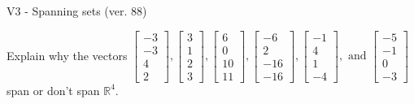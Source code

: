 \begin{exercise}
  \begin{exerciseTitle}V3 - Spanning sets (ver. 88)\end{exerciseTitle}
  \begin{exerciseStatement}
    Explain why the vectors \(\left[\begin{array}{r}
-3 \\
-3 \\
4 \\
2
\end{array}\right] , \left[\begin{array}{r}
3 \\
1 \\
2 \\
3
\end{array}\right] , \left[\begin{array}{r}
6 \\
0 \\
10 \\
11
\end{array}\right] , \left[\begin{array}{r}
-6 \\
2 \\
-16 \\
-16
\end{array}\right] , \left[\begin{array}{r}
-1 \\
4 \\
1 \\
-4
\end{array}\right] , \text{ and } \left[\begin{array}{r}
-5 \\
-1 \\
0 \\
-3
\end{array}\right]\) span or don't span \(\mathbb{R}^4\). 
	



\end{exerciseStatement}
\end{exercise}
